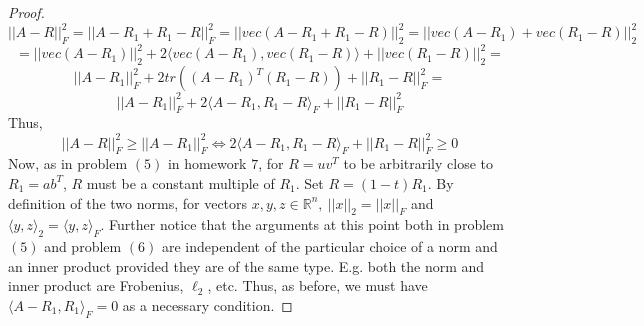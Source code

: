 \documentclass[11pt]{article}
\theoremstyle{quest}
\begin{document}
\begin{proof}
$$||A-R||_F^2 = ||A-R_1+R_1-R||_F^2 = ||vec(A-R_1+R_1-R)||_2^2 = ||vec(A-R_1)+vec(R_1-R)||_2^2$$
$$=||vec(A-R_1)||_2^2 + 2\langle vec(A-R_1), vec(R_1-R) \rangle + ||vec(R_1-R)||_2^2 =$$
$$||A-R_1||_F^2 + 2tr((A-R_1)^T(R_1-R)) + ||R_1-R||_F^2 =$$
$$||A-R_1||_F^2 + 2\langle A-R_1, R_1-R\rangle_F + ||R_1-R||_F^2$$
Thus,
$$||A-R||_F^2 \ge ||A-R_1||_F^2 \iff 2\langle A-R_1, R_1-R\rangle_F + ||R_1-R||_F^2 \ge 0$$
Now, as in problem $(5)$ in homework $7$, for $R = uv^T$ to be arbitrarily close to $R_1 = ab^T$, $R$ must be a constant multiple of $R_1$. Set $R = (1-t)R_1$. By definition of the two norms, for vectors $x,y,z \in \mathbb{R}^n,\ ||x||_2 = ||x||_F$ and $\langle y,z \rangle_2 = \langle y,z \rangle_F$. Further notice that the arguments at this point both in problem $(5)$ and problem $(6)$ are independent of the particular choice of a norm and an inner product provided they are of the same type. E.g. both the norm and inner product are Frobenius, $\ell_2$, etc. Thus, as before, we must have $\langle A-R_1, R_1 \rangle_F = 0$ as a necessary condition.
\end{proof}
\end{document}
